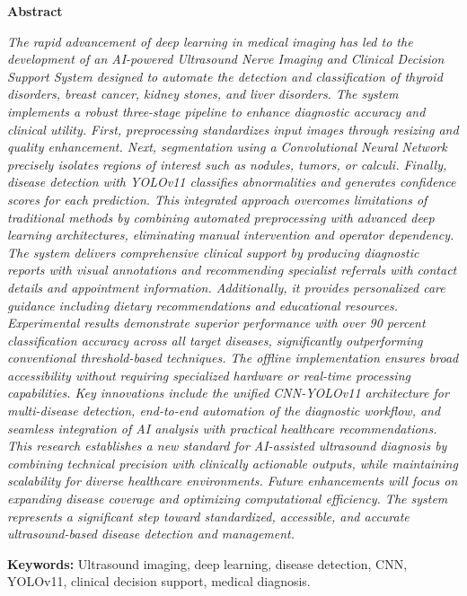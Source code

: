 \documentclass[12pt]{article}
\begin{document}
	
	\begin{center}
		{\Large \bf Abstract}
	\end{center}

    \vspace{20pt}
	
	\onehalfspacing %
	
	\textit{The rapid advancement of deep learning in medical imaging has led to the development of 
an AI-powered Ultrasound Nerve Imaging and Clinical Decision Support System designed to automate the detection and classification of thyroid disorders, breast cancer, kidney stones, and liver disorders. The system implements a robust three-stage pipeline to enhance diagnostic accuracy and clinical utility. First, preprocessing standardizes input images through resizing and quality enhancement. Next, segmentation using a Convolutional Neural Network precisely isolates regions of interest such as nodules, tumors, or calculi. Finally, disease detection with YOLOv11 classifies abnormalities and generates confidence scores for each prediction. This integrated approach overcomes limitations of traditional methods by combining automated preprocessing with advanced deep learning architectures, eliminating manual intervention and operator dependency. The system delivers comprehensive clinical support by producing diagnostic reports with visual annotations and recommending specialist referrals with contact details and appointment information. Additionally, it provides personalized care guidance including dietary recommendations and educational resources. Experimental results demonstrate superior performance with over 90 percent classification accuracy across all target diseases, significantly outperforming conventional threshold-based techniques. The offline implementation ensures broad accessibility without requiring specialized hardware or real-time processing capabilities. Key innovations include the unified CNN-YOLOv11 architecture for multi-disease detection, end-to-end automation of the diagnostic workflow, and seamless integration of AI analysis with practical healthcare 
recommendations. This research establishes a new standard for AI-assisted ultrasound diagnosis by combining technical precision with clinically actionable outputs, while maintaining scalability for diverse healthcare environments. Future enhancements will focus on expanding disease coverage and optimizing computational efficiency. The system represents a significant step toward standardized, accessible, and accurate ultrasound-based disease detection and management.}
	
	\vspace{1em} %
	
	\noindent
	\textbf{Keywords:} Ultrasound imaging, deep learning, disease detection, CNN, YOLOv11, clinical decision support, medical diagnosis.
	
\end{document}
